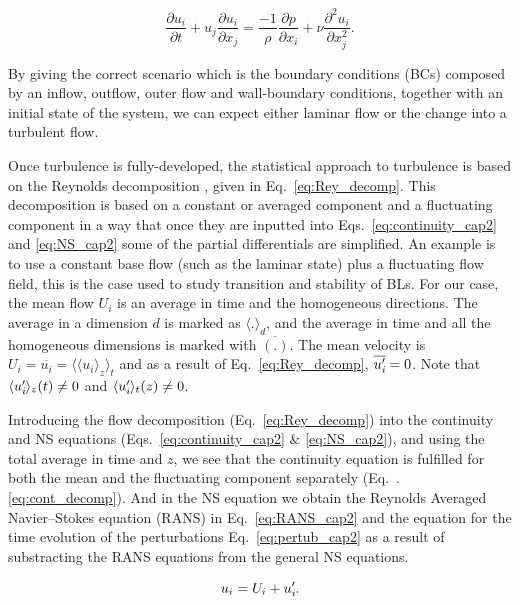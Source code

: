 \begin{equation}
    \label{eq:NS_cap2}
    \frac {\partial u_i} {\partial t}  + u_j \frac {\partial u_i} {\partial x_j} =
    \frac {-1} {\rho} \frac {\partial p} {\partial x_i} +  \nu \frac {\partial^2 u_i} {\partial x_j^2}.
\end{equation}

By giving the correct scenario which is the boundary conditions (BCs) composed by an inflow, outflow, outer flow and wall-boundary conditions, together with an initial state of the system, we can expect either laminar flow or the change into a turbulent flow.



Once turbulence is fully-developed, the statistical approach to turbulence is based on the Reynolds decomposition \citep{Rey_decomp}, given in Eq.~\ref{eq:Rey_decomp}. This decomposition is based on a constant or averaged component and a fluctuating component in a way that once they are inputted into Eqs.~\ref{eq:continuity_cap2} and \ref{eq:NS_cap2} some of the partial differentials are simplified. An example is to use a constant base flow (such as the laminar state) plus a fluctuating flow field, this is the case used to study transition and stability of BLs. 
For our case, the mean flow $U_i$ is an average in time and the homogeneous directions. The average in a dimension $d$ is marked as $\langle . \rangle_d$, and the average in time and all the homogeneous dimensions is marked with $\overline{(.)}$. The mean velocity is $U_i = \overline{u_i} =\langle \langle u_i \rangle_z \rangle_t$ and as a result of Eq.~\ref{eq:Rey_decomp}, $\overline{u_i^{\prime}\mkern-1.2mu}=0$. Note that $\langle u_i^{\prime}\mkern-1.2mu \rangle_z (t) \neq 0$ and $\langle u_i^{\prime}\mkern-1.2mu \rangle_t(z) \neq 0$. 

Introducing the flow decomposition (Eq.~\ref{eq:Rey_decomp}) into the continuity and NS equations (Eqs.~\ref{eq:continuity_cap2} $\&$ \ref{eq:NS_cap2}), and using the total average in time and $z$, we see that the continuity equation is fulfilled for both the mean and the fluctuating component separately (Eq.~.\ref{eq:cont_decomp}). And in the NS equation we obtain the Reynolds Averaged Navier--Stokes equation (RANS) in Eq.~\ref{eq:RANS_cap2} and the equation for the time evolution of the perturbations Eq.~\ref{eq:pertub_cap2} as a result of substracting the RANS equations from the general NS equations.

\begin{equation}
    \label{eq:Rey_decomp}
    u_i = U_i + u_i^{\prime}\mkern-1.2mu.
\end{equation}

